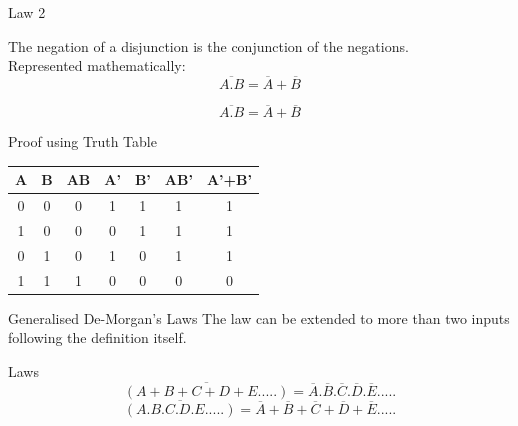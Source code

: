 \documentclass{beamer}
\begin{document}
\begin{frame}{Law 2}
\begin{theorem}
The negation of a disjunction is the conjunction of the negations.\\
Represented mathematically:
\begin{equation}
\overline{A.B}=\overline{A}+\overline{B}
\end{equation}
\end{theorem}
\end{frame}
\begin{frame}
\begin{equation*}
                     \overline{A.B} = \overline{A}+\overline{B}
\end{equation*}
        \begin{block}{Proof using Truth Table}
                \begin{tabular}{|c|c||c||c||c||c||c|}
                        \hline
                         \textbf{A} &
                        \textbf{B} & \textbf{AB} & \textbf{A'} & \textbf{B'} &
                        \textbf{AB'} & \textbf{A'+B'}\\
                        \hline
                        \hline
                         0 & 0 & 0 & 1 & 1 & 1 & 1 \\
                        \hline
                         1 & 0 & 0 & 0 & 1 & 1 & 1 \\
                        \hline
                        0 & 1 & 0 & 1 & 0 & 1 & 1 \\
                        \hline
                         1 & 1 & 1 & 0 & 0 & 0 & 0 \\
                        \hline
                \end{tabular}
        \end{block}
\end{frame}
\begin{frame}{Generalised De-Morgan's Laws}
The law can be extended to more than two inputs following the definition itself.
\pause
\begin{block}{Laws}
\begin{equation}
\overline{(A+B+C+D+E.....)}=\overline{A}.\overline{B}.\overline{C}.\overline{D}.\overline{E}.....
\end{equation}
\begin{equation}
\overline{(A.B.C.D.E.....)}=\overline{A}+\overline{B}+\overline{C}+\overline{D}+\overline{E}.....
\end{equation}
\end{block}
\end{frame}
\end{document}
